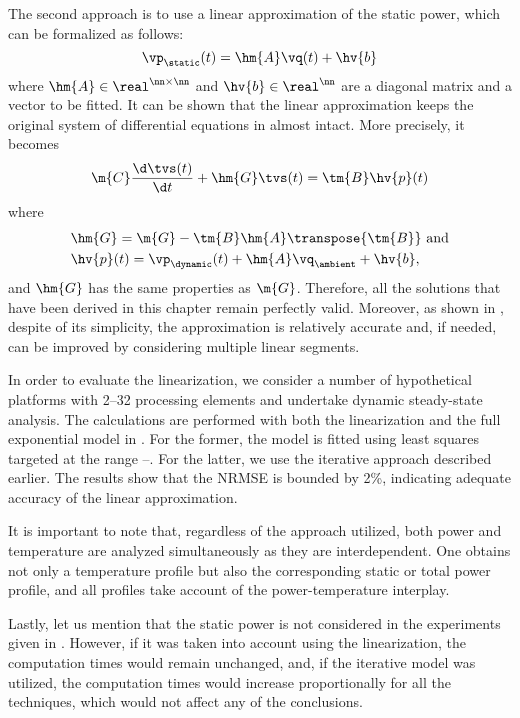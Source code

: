 The second approach is to use a linear approximation of the static power, which
can be formalized as follows:
\[
  \vp_\static(t) = \hm{A} \vq(t) + \hv{b}
\]
where $\hm{A} \in \real^{\nn \times \nn}$ and $\hv{b} \in \real^\nn$ are a
diagonal matrix and a vector to be fitted. It can be shown that the linear
approximation keeps the original system of differential equations in
 almost intact. More precisely, it
becomes
\[
  \m{C} \frac{\d \tvs(t)}{\d t} + \hm{G} \tvs(t) = \tm{B} \hv{p}(t)
\]
where
\begin{align*}
  & \hm{G} = \m{G} - \tm{B} \hm{A} \transpose{\tm{B}} \text{ and} \\
  & \hv{p}(t) = \vp_\dynamic(t) + \hm{A} \vq_\ambient + \hv{b},
\end{align*}
and $\hm{G}$ has the same properties as $\m{G}$. Therefore, all the solutions
that have been derived in this chapter remain perfectly valid. Moreover, as
shown in \cite{liu2007}, despite of its simplicity, the approximation is
relatively accurate and, if needed, can be improved by considering multiple
linear segments.

In order to evaluate the linearization, we consider a number of hypothetical
platforms with 2--32 processing elements and undertake dynamic steady-state
analysis. The calculations are performed with both the linearization and the
full exponential model in . For the former, the model is
fitted using least squares \cite{press2007} targeted at the range
--. For the latter, we use the iterative approach
described earlier. The results show that the \ac{NRMSE} is bounded by 2\%,
indicating adequate accuracy of the linear approximation.

It is important to note that, regardless of the approach utilized, both power
and temperature are analyzed simultaneously as they are interdependent. One
obtains not only a temperature profile but also the corresponding static or
total power profile, and all profiles take account of the power-temperature
interplay.

Lastly, let us mention that the static power is not considered in the
experiments given in . However, if it was taken
into account using the linearization, the computation times would remain
unchanged, and, if the iterative model was utilized, the computation times would
increase proportionally for all the techniques, which would not affect any of
the conclusions.
